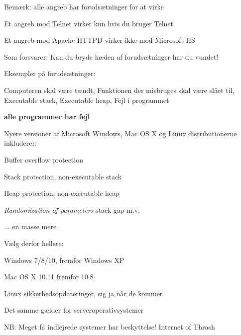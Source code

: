 \documentclass[Screen16to9,17pt]{foils}
\begin{document}
\begin{list1}
\item Bemærk: alle angreb har forudsætninger for at virke
\item Et angreb mod Telnet virker kun hvis du bruger Telnet
\item Et angreb mod Apache HTTPD virker ikke mod Microsoft IIS
\item Som forsvarer: Kan du bryde kæden af forudsætninger har du vundet!
\item Eksempler på forudsætninger:
\item Computeren skal være tændt, Funktionen der misbruges skal være slået til, Executable stack, Executable heap, Fejl i programmet
\end{list1}

\vskip 2cm

\centerline{\color{titlecolor}\LARGE \bf alle programmer har fejl}




\begin{list1}
\item Nyere versioner af Microsoft Windows, Mac OS X og Linux distributionerne inkluderer:
\begin{list2}
\item Buffer overflow protection
\item Stack protection, non-executable stack
\item Heap protection, non-executable heap
\item \emph{Randomization of parameters} stack gap m.v.
\item ... en masse mere
\end{list2}
\item Vælg derfor hellere:
\begin{list2}
\item Windows 7/8/10, fremfor Windows XP
\item Mac OS X 10.11 fremfor 10.8
\item Linux sikkerhedsopdateringer, sig ja når de kommer
\end{list2}
\item Det samme gælder for serveroperativsystemer
\item NB: Meget få indlejrede systemer har beskyttelse! Internet of Thrash
\end{list1}


\end{document}
